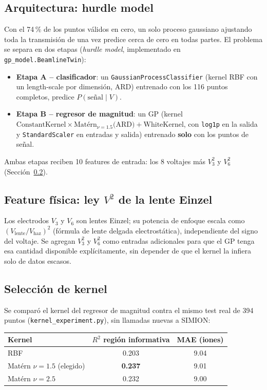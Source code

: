 \documentclass[11pt]{article}
\begin{document}
\subsection{Arquitectura: hurdle model}

Con el 74\,\% de los puntos válidos en cero, un solo proceso gaussiano
ajustando toda la transmisión de una vez predice cerca de cero en todas
partes. El problema se separa en dos etapas (\emph{hurdle model},
implementado en \texttt{gp\_model.BeamlineTwin}):

\begin{itemize}
  \item \textbf{Etapa A -- clasificador}: un \texttt{GaussianProcessClassifier}
  (kernel RBF con un length-scale por dimensión, ARD) entrenado con los 116
  puntos completos, predice $P(\text{señal}\mid V)$.
  \item \textbf{Etapa B -- regresor de magnitud}: un GP (kernel
  $\text{ConstantKernel}\times\text{Matérn}_{\nu=1.5}\text{(ARD)} +
  \text{WhiteKernel}$, con \texttt{log1p} en la salida y \texttt{StandardScaler}
  en entradas y salida) entrenado \textbf{solo} con los puntos de señal.
\end{itemize}

Ambas etapas reciben 10 features de entrada: los 8 voltajes más $V_3^2$ y
$V_6^2$ (Sección~\ref{sec:fisica}).

\subsection{Feature física: ley $V^2$ de la lente Einzel}
\label{sec:fisica}

Los electrodos $V_3$ y $V_6$ son lentes Einzel; su potencia de enfoque
escala como $(V_{\text{lente}}/V_{\text{haz}})^2$ (fórmula de lente delgada
electrostática), independiente del signo del voltaje. Se agregan $V_3^2$ y
$V_6^2$ como entradas adicionales para que el GP tenga esa cantidad
disponible explícitamente, sin depender de que el kernel la infiera solo de
datos escasos.

\subsection{Selección de kernel}

Se comparó el kernel del regresor de magnitud contra el mismo test real de
394 puntos (\texttt{kernel\_experiment.py}), sin llamadas nuevas a SIMION:

\begin{center}
\begin{tabular}{lcc}
\toprule
Kernel & $R^2$ región informativa & MAE (iones) \\
\midrule
RBF                & 0.203 & 9.04 \\
Matérn $\nu=1.5$ (elegido) & \textbf{0.237} & 9.01 \\
Matérn $\nu=2.5$   & 0.232 & 9.00 \\
\bottomrule
\end{tabular}
\end{center}
\end{document}
